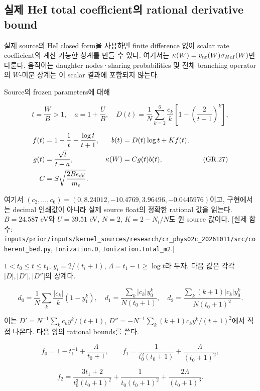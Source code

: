 \documentclass[11pt,a4paper]{article}
\begin{document}
\hypertarget{uxc2e4uxc81c-hei-total-coefficientuxc758-rational-derivative-bound}{%
\subsection{실제 HeI total coefficient의 rational derivative bound}\label{uxc2e4uxc81c-hei-total-coefficientuxc758-rational-derivative-bound}}

실제 source의 HeI closed form을 사용하면 finite difference 없이 scalar rate coefficient의 계산 가능한 상계를 만들 수 있다. 여기서는 \(\kappa(W)=v_{\rm nr}(W)\sigma_{HeI}(W)\)만 다룬다. 움직이는 daughter nodes·sharing probabilities 및 전체 branching operator의 \(W\)-미분 상계는 이 scalar 결과에 포함되지 않는다.

Source의 frozen parameters에 대해

\[
 t=\frac WB>1,\quad a=1+\frac UB,\quad
 D(t)=\frac1N\sum_{k=2}^{6}\frac{c_k}{k}
       \left[1-\left(\frac2{t+1}\right)^k\right],
\tag{GR.26}
\]

\[
 \begin{aligned}
 f(t)&=1-\frac1t-\frac{\log t}{t+1},
 &b(t)&=D(t)\log t+Kf(t),\\
 g(t)&=\frac{\sqrt t}{t+a},
 &\kappa(W)&=C g(t)b(t),\\
 C&=S\sqrt{\frac{2B\epsilon_{\rm eV}}{m_e}}.
 \end{aligned}
\tag{GR.27}
\]

여기서 \((c_2,\ldots,c_6)=(0,8.24012,-10.4769,3.96496,-0.0445976)\)이고, 구현에서는 decimal 인쇄값이 아니라 실제 source float의 정확한 rational 값을 읽는다. \(B=24.587\) eV와 \(U=39.51\) eV, \(N=2\), \(K=2-N_i/N\)도 원 source 값이다. {[}실제 함수: \nolinkurl{inputs/prior/inputs/kernel_sources/research/cr_phys02c_20261011/src/coherent_bed.py}, \texttt{Ionization.D}, \texttt{Ionization.total\_m2}.{]}

\(1<t_0\le t\le t_1\), \(y_i=2/(t_i+1)\), \(\Lambda=t_1-1\ge\log t\)라 두자. 다음 값은 각각 \(|D|,|D'|,|D''|\)의 상계다.

\[
 d_0=\frac1N\sum_k\frac{|c_k|}{k}(1-y_1^k),\quad
 d_1=\frac{\sum_k|c_k|y_0^k}{N(t_0+1)},\quad
 d_2=\frac{\sum_k(k+1)|c_k|y_0^k}{N(t_0+1)^2}.
\tag{GR.28}
\]

이는 \(D'=N^{-1}\sum_kc_ky^k/(t+1)\), \(D''=-N^{-1}\sum_k(k+1)c_ky^k/(t+1)^2\)에서 직접 나온다. 다음 양의 rational bounds를 쓴다.

\[
 f_0=1-t_1^{-1}+\frac{\Lambda}{t_0+1},\qquad
 f_1=\frac1{t_0^2(t_0+1)}+\frac{\Lambda}{(t_0+1)^2},
\tag{GR.29}
\]

\[
 f_2=\frac{3t_1+2}{t_0^3(t_0+1)^2}
       +\frac1{t_0(t_0+1)^2}+\frac{2\Lambda}{(t_0+1)^3}.
\tag{GR.30}
\]
\end{document}
